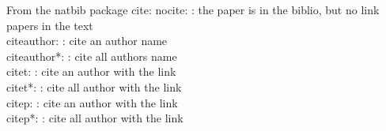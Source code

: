 \newpage
From the natbib package
cite: %
nocite: \nocite{ches-2002-chari}: the paper is in the biblio, but no link papers in the text\\
citeauthor: \citeauthor{ches-2002-chari}: cite an author name\\
citeauthor*: \citeauthor*{ches-2002-chari}: cite all authors name\\
citet: \citet{ches-2002-chari}: cite an author with the link\\
citet*: \citet*{ches-2002-chari}: cite all author with the link\\
citep: \citep{ches-2002-chari}: cite an author with the link\\
citep*: \citep*{ches-2002-chari}: cite all author with the link\\
